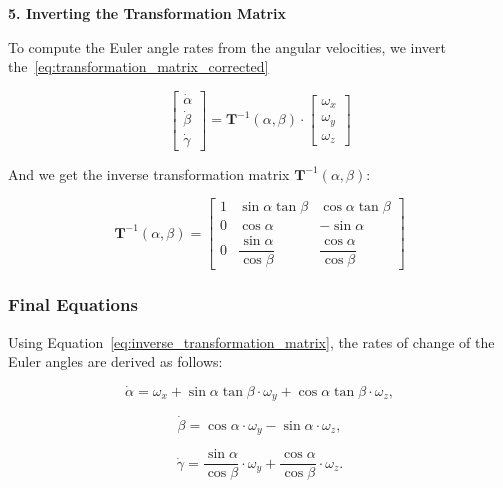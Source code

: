 \documentclass[12pt]{article}
\begin{document}
\textbf{5. Inverting the Transformation Matrix}

To compute the Euler angle rates from the angular velocities, we invert the~\ref{eq:transformation_matrix_corrected}

\begin{equation}
    \label{eq:euler_rates}
    \begin{bmatrix}
    \dot{\alpha} \\
    \dot{\beta} \\
    \dot{\gamma}
    \end{bmatrix}
    =
    \mathbf{T}^{-1}(\alpha, \beta)
    \cdot
    \begin{bmatrix}
    \omega_x \\
    \omega_y \\
    \omega_z
    \end{bmatrix}
\end{equation}

And we get the inverse transformation matrix $\mathbf{T}^{-1}(\alpha, \beta)$:

\begin{equation}
\label{eq:inverse_transformation_matrix}
\mathbf{T}^{-1}(\alpha, \beta) =
\begin{bmatrix}
1 & \sin\alpha \tan\beta & \cos\alpha \tan\beta \\
0 & \cos\alpha & -\sin\alpha \\
0 & \dfrac{\sin\alpha}{\cos\beta} & \dfrac{\cos\alpha}{\cos\beta}
\end{bmatrix}
\end{equation}

\subsubsection{Final Equations}

Using Equation~\eqref{eq:inverse_transformation_matrix}, the rates of change of the Euler angles are derived as follows:

\begin{equation}
\label{eq:alpha_dot_final}
\dot{\alpha} = \omega_x + \sin\alpha \tan\beta \cdot \omega_y + \cos\alpha \tan\beta \cdot \omega_z,
\end{equation}

\begin{equation}
\label{eq:beta_dot_final}
\dot{\beta} = \cos\alpha \cdot \omega_y - \sin\alpha \cdot \omega_z,
\end{equation}

\begin{equation}
\label{eq:gamma_dot_final}
\dot{\gamma} = \frac{\sin\alpha}{\cos\beta} \cdot \omega_y + \frac{\cos\alpha}{\cos\beta} \cdot \omega_z.
\end{equation}
\end{document}

